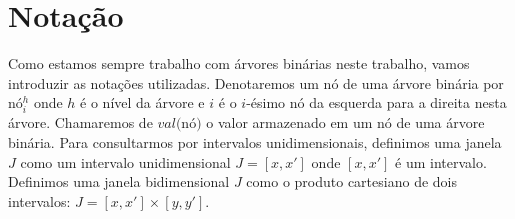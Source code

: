 \section{Notação}
Como estamos sempre trabalho com árvores binárias neste trabalho, vamos introduzir as notações utilizadas.
Denotaremos um nó de uma árvore binária por nó$^h_i$ onde $h$ é o nível da árvore e $i$ é o $i$-ésimo nó da esquerda para a direita nesta árvore. Chamaremos de $val($nó$)$ o valor armazenado em um nó de uma árvore binária. Para consultarmos por intervalos unidimensionais, definimos uma janela $J$ como um intervalo unidimensional $J = [x, x']$ onde $[x, x']$ é um intervalo. Definimos uma janela bidimensional $J$ como o produto cartesiano de dois intervalos: $J = [x, x'] \times [y, y']$.